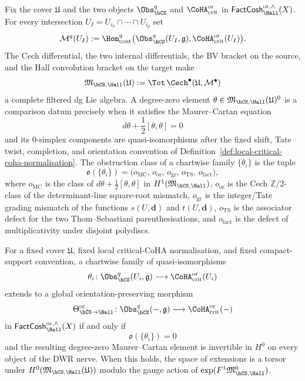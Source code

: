 \begin{definition}
\label{def:hcs-hall-descent-obstruction}
Fix the cover $\mathfrak U$ and the two objects
$\Obs_{\hCS}^{q}$ and $\CoHA_{\mathrm{crit}}^{\mathrm{or}}$ in
$\mathsf{FactCosh}_{\Hall}^{\mathrm{or},\wedge}(X)$. For every
intersection $U_I=U_{i_0}\cap\cdots\cap U_{i_p}$ set
\[
 \mathcal M^q(U_I)
 :=
 \Hom_{\mathrm{cont}}^q
 \bigl(\Obs_{\hCS}^{q}(U_I,\mathfrak g),
 \CoHA_{\mathrm{crit}}^{\mathrm{or}}(U_I)\bigr).
\]
The Cech differential, the two internal differentials, the BV bracket
on the source, and the Hall convolution bracket on the target make
\[
 \mathfrak M_{\hCS,\Hall}(\mathfrak U)
 :=
 \Tot\,\Cech^\bullet(\mathfrak U,\mathcal M^\bullet)
\]
a complete filtered dg Lie algebra. A degree-zero element
$\theta\in\mathfrak M_{\hCS,\Hall}(\mathfrak U)^0$ is a comparison
datum precisely when it satisfies the Maurer--Cartan equation
\[
 d\theta+\frac{1}{2}[\theta,\theta]=0
\]
and its $0$-simplex components are quasi-isomorphisms after the fixed
shift, Tate twist, completion, and orientation convention of
Definition~\ref{def:local-critical-coha-normalisation}. The obstruction
class of a chartwise family $\{\theta_i\}$ is the tuple
\[
 \mathfrak o(\{\theta_i\})
 =
 \bigl(
 o_{\mathrm{MC}},\,
 o_{\mathrm{or}},\,
 o_{\mathrm{gr}},\,
 o_{\mathrm{TS}},\,
 o_{\mathrm{fact}}
 \bigr),
\]
where $o_{\mathrm{MC}}$ is the class of
$d\theta+\frac{1}{2}[\theta,\theta]$ in
$H^1(\mathfrak M_{\hCS,\Hall})$, $o_{\mathrm{or}}$ is the Cech
$\mathbb Z/2$-class of the determinant-line square-root mismatch,
$o_{\mathrm{gr}}$ is the integer/Tate grading mismatch of the functions
$s(U,\mathbf d)$ and $t(U,\mathbf d)$, $o_{\mathrm{TS}}$ is the
associator defect for the two Thom--Sebastiani parenthesisations, and
$o_{\mathrm{fact}}$ is the defect of multiplicativity under disjoint
polydiscs.
\end{definition}

\begin{theorem}
\label{thm:hcs-hall-descent-criterion}
For a fixed cover $\mathfrak U$, fixed local critical-CoHA
normalisation, and fixed compact-support convention, a chartwise family
of quasi-isomorphisms
\[
 \theta_i\colon
 \Obs_{\hCS}^{q}(U_i,\mathfrak g)
 \longrightarrow
 \CoHA_{\mathrm{crit}}^{\mathrm{or}}(U_i)
\]
extends to a global orientation-preserving morphism
\[
 \Theta_{\hCS\to\Hall}^{\mathrm{or}}\colon
 \Obs_{\hCS}^{q}(-,\mathfrak g)
 \longrightarrow
 \CoHA_{\mathrm{crit}}^{\mathrm{or}}(-)
\]
in
$\mathsf{FactCosh}_{\Hall}^{\mathrm{or},\wedge}(X)$ if and only if
\[
 \mathfrak o(\{\theta_i\})=0
\]
and the resulting degree-zero Maurer--Cartan element is invertible in
$H^0$ on every object of the DWR nerve. When this holds, the space of
extensions is a torsor under
$H^0(\mathfrak M_{\hCS,\Hall}(\mathfrak U))$ modulo the gauge action of
$\exp(F^1\mathfrak M_{\hCS,\Hall}^0)$.
\end{theorem}

